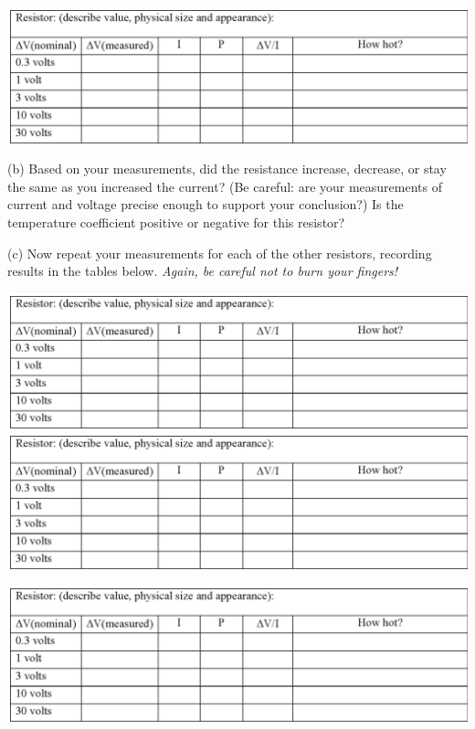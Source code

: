 \begin{center}
\includegraphics[width=1.0\textwidth]{electric_power/iv_table.eps}
\end{center}

(b)  Based on your measurements, did the resistance increase, decrease, or stay the same as you increased the current?  (Be careful: are your measurements of current and voltage precise enough to support your conclusion?)  Is the temperature coefficient positive or negative for this resistor? 
\vspace{1.5in}

\begin{center}
 \par
\end{center}

(c) Now repeat your measurements for each of the other resistors, recording results in the tables below.  \textit{Again, be careful not to burn your fingers!}
\begin{center}
\includegraphics[width=1.0\textwidth]{electric_power/iv_table.eps}
\includegraphics[width=1.0\textwidth]{electric_power/iv_table.eps}

\vspace{0.5in}
\includegraphics[width=1.0\textwidth]{electric_power/iv_table.eps}
\end{center}

